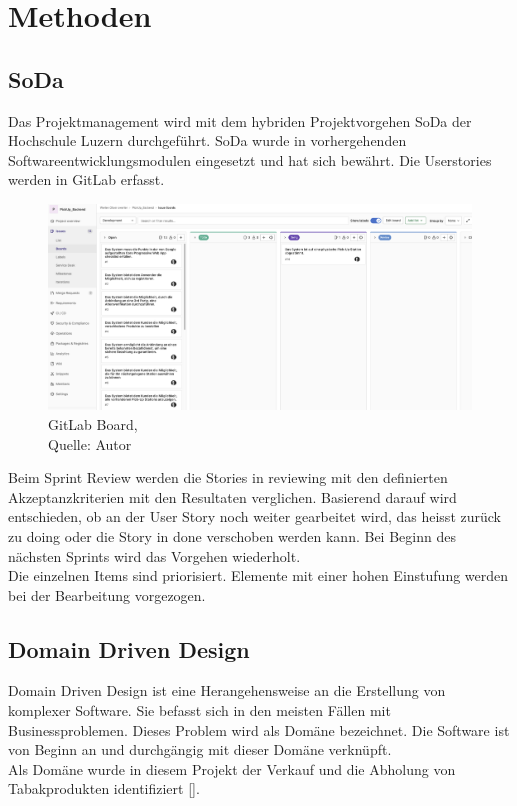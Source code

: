 \section{Methoden}
\subsection{\gls{SoDa}}
Das Projektmanagement wird mit dem hybriden Projektvorgehen \gls{SoDa} der Hochschule Luzern durchgeführt. 
\gls{SoDa} wurde in vorhergehenden Softwareentwicklungsmodulen eingesetzt und hat sich bewährt. Die Userstories werden in \gls{GitLab} erfasst.  
\begin{figure}[H]
	\centering
	\includegraphics[width=1\textwidth]{images/boardGitlab.png}
	\caption[GitLab Board]{GitLab Board,\\ Quelle: Autor}
	\label{img: GitlLabBoard}
\end{figure}
Beim Sprint Review werden die Stories in \glqq reviewing\grqq{} mit den definierten Akzeptanzkriterien mit den Resultaten verglichen. Basierend darauf wird entschieden, ob an der \gls{User Story} noch weiter gearbeitet wird, das heisst zurück zu \glqq doing\grqq{} oder die Story in \glqq done\grqq{} verschoben werden kann. Bei Beginn des nächsten Sprints wird das Vorgehen wiederholt. \\
Die einzelnen Items sind priorisiert. Elemente mit einer hohen Einstufung werden bei der Bearbeitung vorgezogen. 
\newpage
\subsection{Domain Driven Design}
Domain Driven Design ist eine Herangehensweise an die Erstellung von komplexer Software. Sie befasst sich in den meisten Fällen mit Businessproblemen. Dieses Problem wird als Domäne bezeichnet. Die Software ist von Beginn an und durchgängig mit dieser Domäne verknüpft. \\
Als Domäne wurde in diesem Projekt der Verkauf und die Abholung von Tabakprodukten identifiziert [\cite{domainDrivenDesign}]. 

